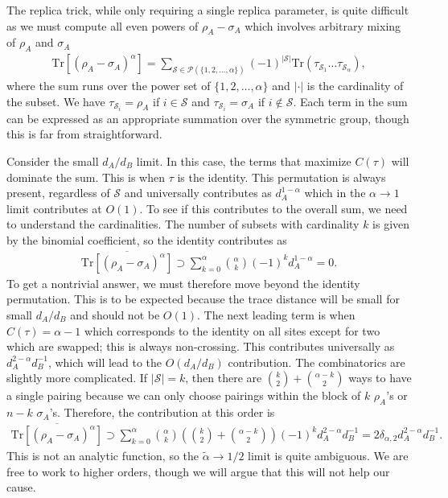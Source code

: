 \documentclass[a4paper,11pt]{article}
\newcommand{\Tr}{\text{Tr}}
\newcommand*{\JKF}[1]{\textcolor{blue}{[JKF: #1]}}
\newcommand*{\SR}[1]{\textcolor{magenta}{[SR: \textsf{#1}]}}
\begin{document}
The replica trick, while only requiring a single replica parameter, is quite difficult as we must compute all even powers of $\rho_A - \sigma_A$ which involves arbitrary mixing of $\rho_A$ and $\sigma_A$ \cite{2019PhRvL.122n1602Z}
\begin{align}
    \Tr\left[ (\rho_A- \sigma_A)^{\alpha}\right] = \sum_{\mathcal{S} \in \mathcal{P}(\{1,2,\dots,  \alpha\})}(-1)^{|\mathcal{S}|}\Tr (\tau_{\mathcal{S}_1}\dots \tau_{\mathcal{S}_{\alpha}} ),
\end{align}
where the sum runs over the power set of $\{ 1,2,\dots, \alpha\}$ and $|\cdot|$ is the cardinality of the subset. We have $\tau_{\mathcal{S}_i} = \rho_A$ 
if $i \in \mathcal{S}$ and $\tau_{\mathcal{S}_i} = \sigma_A$ 
if $i \notin \mathcal{S}$. Each term in the sum can be expressed as an appropriate summation over the symmetric group, though this is far from straightforward.

Consider the small $d_A/d_B$ limit. In this case, the terms that maximize $C(\tau)$ will dominate the sum. This is when $\tau$ is the identity. This permutation is always present, regardless of $\mathcal{S}$ and universally contributes as $d_A^{1-\alpha}$ which in the $\alpha \rightarrow 1$ limit contributes at $O(1)$. To see if this contributes to the overall sum, we need to understand the cardinalities. The number of subsets with cardinality $k$ is given by the binomial coefficient, so the identity contributes as
\begin{align}
    \overline{\Tr\left[ (\rho_A- \sigma_A)^{\alpha}\right]} \supset \sum_{k = 0}^{{\alpha}}\binom{{\alpha}}{k}(-1)^{k}d_A^{1-{\alpha}} = 0.
\end{align}
To get a nontrivial answer, we must therefore move beyond the identity permutation. This is to be expected because the trace distance will be small for small $d_A/d_B$ and should not be $O(1)$. The next leading term is when $C(\tau) = \alpha-1$ which corresponds to the identity on all sites except for two which are swapped; this is always non-crossing. This contributes universally as $d_A^{2-\alpha} d_B^{-1}$, which will lead to the $O(d_A/d_B)$ contribution. The combinatorics are slightly more complicated. If $|\mathcal{S}| = k$, then there are $
    \binom{k}{2}+\binom{\alpha-k}{2}
$
ways to have a single pairing because we can only choose pairings within the block of $k$ $\rho_A$'s or $n-k$ $\sigma_A$'s. Therefore, the contribution at this order is
\begin{align}
    \overline{\Tr\left[ (\rho_A- \sigma_A)^{\alpha}\right]} \supset \sum_{k = 0}^{\alpha}\binom{{\alpha}}{k}\left(\binom{k}{2}+\binom{{\alpha}-k}{2}\right)(-1)^{k}d_A^{2-{\alpha}} d_B^{-1}= 2\delta_{\alpha, 2}d_A^{2-{\alpha}} d_B^{-1}.
\end{align}
This is not an analytic function, so the $\tilde{\alpha} \rightarrow 1/2$ limit is quite ambiguous. We are free to work to higher orders, though we will argue that this will not help our cause. 
\end{document}
